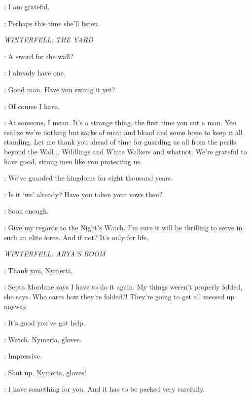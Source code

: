 \CATELYN: I am grateful. 

\CERSEI: Perhaps this time she'll listen. 

\scene

\textit{WINTERFELL: THE YARD}


\JAIME: A sword for the wall? 

\JON: I already have one. 

\JAIME: Good man. Have you swung it yet? 

\JON: Of course I have. 

\JAIME: At someone, I mean. It's a strange thing, the first time you cut a man. You realize we're nothing but sacks of meat and blood and some bone to keep it all standing. Let me thank you ahead of time for guarding us all from the perils beyond the Wall$\ldots$ Wildlings and White Walkers and whatnot. We're grateful to have good, strong men like you protecting us. 

\JON: We've guarded the kingdoms for eight thousand years. 

\JAIME: Is it `we' already? Have you taken your vows then? 

\JON: Soon enough. 

\JAIME: Give my regards to the Night's Watch. I'm sure it will be thrilling to serve in such an elite force. And if not? It's only for life. 

\scene

\textit{WINTERFELL: ARYA'S ROOM}


\ARYA: Thank you, Nymeria. 


\ARYA: Septa Mordane says I have to do it again. My things weren't properly folded, she says. Who cares how they're folded?! They're going to get all messed up anyway. 

\JON: It's good you've got help. 

\ARYA: Watch. Nymeria, gloves.


\JON: Impressive. 

\ARYA: Shut up. Nymeria, gloves! 


\JON: I have something for you. And it has to be packed very carefully. 


